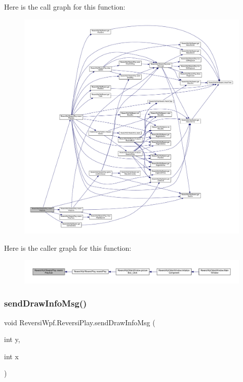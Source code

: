 Here is the call graph for this function\+:\nopagebreak
\begin{figure}[H]
\begin{center}
\leavevmode
\includegraphics[width=350pt]{class_reversi_wpf_1_1_reversi_play_ae7e23ef808336291a39f0ac37687d1dc_cgraph}
\end{center}
\end{figure}
Here is the caller graph for this function\+:\nopagebreak
\begin{figure}[H]
\begin{center}
\leavevmode
\includegraphics[width=350pt]{class_reversi_wpf_1_1_reversi_play_ae7e23ef808336291a39f0ac37687d1dc_icgraph}
\end{center}
\end{figure}
\mbox{\label{class_reversi_wpf_1_1_reversi_play_ad05442c4f60d564ea30e57e782efe985}} 
\subsubsection{\texorpdfstring{send\+Draw\+Info\+Msg()}{sendDrawInfoMsg()}}
{\footnotesize\ttfamily void Reversi\+Wpf.\+Reversi\+Play.\+send\+Draw\+Info\+Msg (\begin{DoxyParamCaption}\item[{int}]{y,  }\item[{int}]{x }\end{DoxyParamCaption})}



